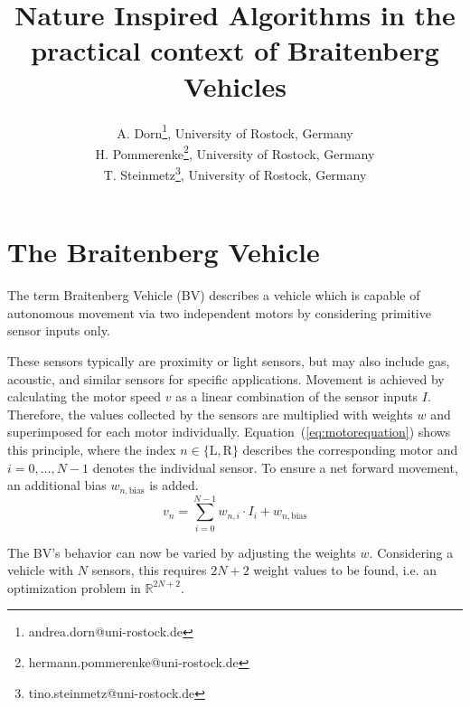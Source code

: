 \documentclass[a4paper]{jacow}
\begin{document}

\title{Nature Inspired Algorithms in the practical context of Braitenberg Vehicles}

\author{A. Dorn\thanks{andrea.dorn@uni-rostock.de}, University of Rostock, Germany \\
		H. Pommerenke\thanks{hermann.pommerenke@uni-rostock.de}, University of Rostock, Germany \\
		T. Steinmetz\thanks{tino.steinmetz@uni-rostock.de}, University of Rostock, Germany}
	
\maketitle


\section{The Braitenberg Vehicle}

The term Braitenberg Vehicle (BV) describes a vehicle which is capable of autonomous movement via two independent motors by considering primitive sensor inputs only.

These sensors typically are proximity or light sensors, but may also include gas, acoustic, and similar sensors for specific applications. Movement is achieved by calculating the motor speed $v$ as a linear combination of the sensor inputs $I$. Therefore, the values collected by the sensors are multiplied with weights $w$ and superimposed for each motor individually. Equation~(\ref{eq:motorequation}) shows this principle, where the index $n\in\{\mathrm{L},\mathrm{R}\}$ describes the corresponding motor and $i=0,\ldots,N-1$ denotes the individual sensor. To ensure a net forward movement, an additional bias $w_{n,\text{bias}}$ is added.
\begin{equation}
	v_{n} = \sum\limits_{i=0}^{N-1} w_{n,i}\cdot I_{i} + w_{n,\text{bias}}
	\label{eq:motorequation}
\end{equation}

The BV's behavior can now be varied by adjusting the weights $w$. Considering a vehicle with $N$ sensors, this requires $2N+2$ weight values to be found, i.e. an optimization problem in $\mathbb{R}^{2N+2}$.
\end{document}
